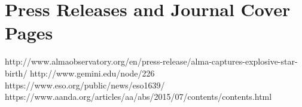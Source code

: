 
\setlength{\extrarowheight}{7pt}

\section*{Press Releases and Journal Cover Pages}

http://www.almaobservatory.org/en/press-release/alma-captures-explosive-star-birth/
http://www.gemini.edu/node/226
https://www.eso.org/public/news/eso1639/
https://www.aanda.org/articles/aa/abs/2015/07/contents/contents.html
